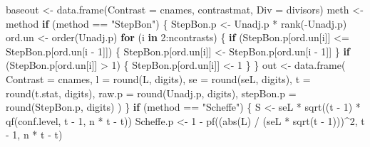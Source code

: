 \documentclass[
]{book}
\newenvironment{Shaded}{\begin{snugshade}}{\end{snugshade}}
\newcommand{\AttributeTok}[1]{\textcolor[rgb]{0.77,0.63,0.00}{#1}}
\newcommand{\ControlFlowTok}[1]{\textcolor[rgb]{0.13,0.29,0.53}{\textbf{#1}}}
\newcommand{\DecValTok}[1]{\textcolor[rgb]{0.00,0.00,0.81}{#1}}
\newcommand{\FunctionTok}[1]{\textcolor[rgb]{0.00,0.00,0.00}{#1}}
\newcommand{\NormalTok}[1]{#1}
\newcommand{\OtherTok}[1]{\textcolor[rgb]{0.56,0.35,0.01}{#1}}
\newcommand{\SpecialCharTok}[1]{\textcolor[rgb]{0.00,0.00,0.00}{#1}}
\newcommand{\StringTok}[1]{\textcolor[rgb]{0.31,0.60,0.02}{#1}}
\begin{document}
\begin{Shaded}
\begin{Highlighting}[]
\NormalTok{  baseout }\OtherTok{\textless{}{-}} \FunctionTok{data.frame}\NormalTok{(}\AttributeTok{Contrast =}\NormalTok{ cnames, contrastmat, }\AttributeTok{Div =}\NormalTok{ divisors)}
\NormalTok{  meth }\OtherTok{\textless{}{-}}\NormalTok{ method}
  \ControlFlowTok{if}\NormalTok{ (method }\SpecialCharTok{==} \StringTok{"StepBon"}\NormalTok{) \{}
\NormalTok{    StepBon.p }\OtherTok{\textless{}{-}}\NormalTok{ Unadj.p }\SpecialCharTok{*} \FunctionTok{rank}\NormalTok{(}\SpecialCharTok{{-}}\NormalTok{Unadj.p)}
\NormalTok{    ord.un }\OtherTok{\textless{}{-}} \FunctionTok{order}\NormalTok{(Unadj.p)}
    \ControlFlowTok{for}\NormalTok{ (i }\ControlFlowTok{in} \DecValTok{2}\SpecialCharTok{:}\NormalTok{ncontrasts) \{}
      \ControlFlowTok{if}\NormalTok{ (StepBon.p[ord.un[i]] }\SpecialCharTok{\textless{}=}\NormalTok{ StepBon.p[ord.un[i }\SpecialCharTok{{-}} \DecValTok{1}\NormalTok{]]) \{}
\NormalTok{        StepBon.p[ord.un[i]] }\OtherTok{\textless{}{-}}
\NormalTok{          StepBon.p[ord.un[i }\SpecialCharTok{{-}} \DecValTok{1}\NormalTok{]]}
\NormalTok{      \}}
      \ControlFlowTok{if}\NormalTok{ (StepBon.p[ord.un[i]] }\SpecialCharTok{\textgreater{}} \DecValTok{1}\NormalTok{) \{}
\NormalTok{        StepBon.p[ord.un[i]] }\OtherTok{\textless{}{-}} \DecValTok{1}
\NormalTok{      \}}
\NormalTok{    \}}
\NormalTok{    out }\OtherTok{\textless{}{-}} \FunctionTok{data.frame}\NormalTok{(}
      \AttributeTok{Contrast =}\NormalTok{ cnames, }\AttributeTok{l =} \FunctionTok{round}\NormalTok{(L, digits),}
      \AttributeTok{se =} \FunctionTok{round}\NormalTok{(seL, digits), }\AttributeTok{t =} \FunctionTok{round}\NormalTok{(t.stat, digits), }\AttributeTok{raw.p =} \FunctionTok{round}\NormalTok{(Unadj.p, digits),}
      \AttributeTok{stepBon.p =} \FunctionTok{round}\NormalTok{(StepBon.p, digits)}
\NormalTok{    )}
\NormalTok{  \}}
  \ControlFlowTok{if}\NormalTok{ (method }\SpecialCharTok{==} \StringTok{"Scheffe"}\NormalTok{) \{}
\NormalTok{    S }\OtherTok{\textless{}{-}}\NormalTok{ seL }\SpecialCharTok{*} \FunctionTok{sqrt}\NormalTok{((t }\SpecialCharTok{{-}} \DecValTok{1}\NormalTok{) }\SpecialCharTok{*} \FunctionTok{qf}\NormalTok{(conf.level, t }\SpecialCharTok{{-}} \DecValTok{1}\NormalTok{, n }\SpecialCharTok{*}\NormalTok{ t }\SpecialCharTok{{-}}\NormalTok{ t))}
\NormalTok{    Scheffe.p }\OtherTok{\textless{}{-}} \DecValTok{1} \SpecialCharTok{{-}} \FunctionTok{pf}\NormalTok{((}\FunctionTok{abs}\NormalTok{(L) }\SpecialCharTok{/}\NormalTok{ (seL }\SpecialCharTok{*} \FunctionTok{sqrt}\NormalTok{(t }\SpecialCharTok{{-}} \DecValTok{1}\NormalTok{)))}\SpecialCharTok{\^{}}\DecValTok{2}\NormalTok{, t }\SpecialCharTok{{-}} \DecValTok{1}\NormalTok{, n }\SpecialCharTok{*}\NormalTok{ t }\SpecialCharTok{{-}}\NormalTok{ t)}

\end{Highlighting}
\end{Shaded}
\end{document}
